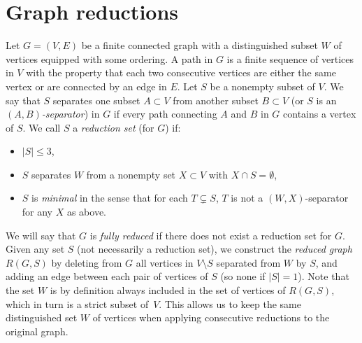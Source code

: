 \documentclass{article}
\numberwithin{equation}{section}
\theoremstyle{definition}
\theoremstyle{definition}
\theoremstyle{remark}
\begin{document}
\section{Graph reductions}\label{sec:graphred}
Let $G = (V, E)$ be a finite connected graph with a distinguished subset $W$ of vertices equipped with some ordering. 
A path in $G$ is a finite sequence of vertices in $V$ with the property that each two 
consecutive vertices are either the same vertex or are connected by an edge in $E$.
Let $S$ be a nonempty subset of $V$. 
We say that $S$ separates one subset $A \subset V$ from another subset  $B \subset V$ (or $S$ is an \emph{$(A, B)$-separator}) in $G$ 
if every path connecting $A$ and $B$ in $G$ contains a vertex of $S$. 
We call $S$ a \emph{reduction set} (for $G$) if:
\begin{itemize}
    \item $|S|\leq 3$,
    \item $S$ separates $W$ from a nonempty set $X \subset V$ with $X \cap S = \emptyset$,
    \item $S$ is \emph{minimal} in the sense that for each $T \subsetneq S$, 
    $T$ is not a $(W, X)$-separator for any $X$ as above.
\end{itemize}
We will say that $G$ is \emph{fully reduced} if there does not exist a reduction set for $G$.
\\[1em]
\noindent Given any set $S$ (not necessarily a reduction set), we construct the \emph{reduced graph} $R({G},S)$ by deleting from $G$ 
all vertices in $V\setminus S$ separated from $W$ by $S$, 
and adding an edge between each pair of vertices of $S$ (so none if $|S| = 1$). 
Note that the set $W$ is by definition always included in the set of vertices of $R({G},S)$, 
which in turn is a strict subset of~$V$. This allows us to keep the same distinguished set $W$ 
of vertices when applying consecutive reductions to the original graph. 
\end{document}
